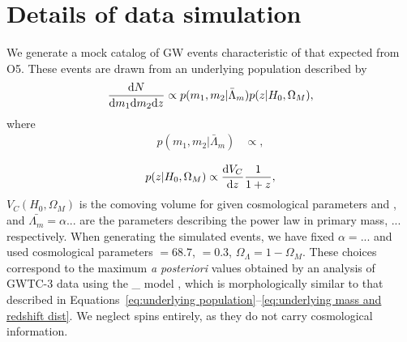 \documentclass[]{aastex631}
\begin{document}

\appendix
\section{Details of data simulation}
\label{ap:data generation}

We generate a mock catalog of \ac{GW} events characteristic of that expected from \acf{O5}. 
These events are drawn from an underlying population described by
\begin{equation}
\label{eq:underlying population}
    \frac{\diff N}{\diff m_1 \diff m_2 \diff z} \propto p(m_1, m_2|\bar{\Lambda}_m) p(z|H_0, \Omega_M),
\end{equation}
where 
\begin{align}
    p(m_1,m_2|\bar{\Lambda}_m) &\propto ,\\
\label{eq:underlying mass dist}
\end{align}
\begin{equation}
    p(z|H_0, \Omega_M) \propto \frac{\diff V_C}{\diff z} \frac{1}{1+z},
    \label{eq:underlying redshift dist}
\end{equation}
$V_C(H_0, \Omega_M)$ is the comoving volume for given cosmological parameters \Ho{} and \Omm{}, and $\bar{\Lambda_m} = \alpha$... are the parameters describing the power law in primary mass, ... respectively. 
When generating the simulated events, we have fixed $\alpha= $... and used cosmological parameters \Ho$=68.7$, \Omm$=0.3$, $\Omega_\Lambda=1-\Omega_M$.
These choices correspond to the maximum \emph{a posteriori} values obtained by an analysis of GWTC-3 data using the \_ model \cite{o3b_pop}, which is morphologically similar to that described in Equations~\ref{eq:underlying population}--\ref{eq:underlying mass and redshift dist}.
We neglect spins entirely, as they do not carry cosmological information.
\end{document}
